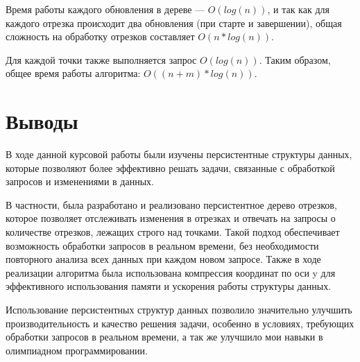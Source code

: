 \documentclass[12pt]{article}
\begin{document}
\begin{figure}[htbp]
    \centering
    \label{fig:graph}
\end{figure}

Время работы каждого обновления в дереве — $O(log(n))$, и так как для каждого отрезка происходит два обновления (при старте и завершении), общая сложность на обработку отрезков составляет $O(n*log(n))$.

Для каждой точки также выполняется запрос $O(log(n))$. Таким образом, общее время работы алгоритма: $O((n + m)*log(n))$.

\newpage
\section*{Выводы}

В ходе данной курсовой работы были изучены персистентные структуры данных, которые позволяют более эффективно решать задачи, связанные с обработкой запросов и изменениями в данных. 

В частности, была разработано и реализовано персистентное дерево отрезков, которое позволяет отслеживать изменения в отрезках и отвечать на запросы о количестве отрезков, лежащих строго над точками. Такой подход обеспечивает возможность обработки запросов в реальном времени, без необходимости повторного анализа всех данных при каждом новом запросе. Также в ходе реализации алгоритма была использована компрессия координат по оси y для эффективного использования памяти и ускорения работы структуры данных.

Использование персистентных структур данных позволило значительно улучшить производительность и качество решения задачи, особенно в условиях, требующих обработки запросов в реальном времени, а так же улучшило мои навыки в олимпиадном программировании.
\end{document}
